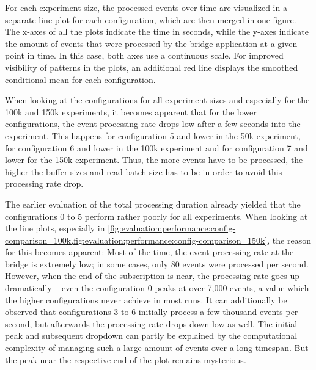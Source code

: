 For each experiment size, the processed events over time are visualized in a separate line plot for each configuration, which are then merged in one figure.
The x-axes of all the plots indicate the time in seconds, while the y-axes indicate the amount of events that were processed by the bridge application at a given point in time.
In this case, both axes use a continuous scale.
For improved visibility of patterns in the plots, an additional red line displays the smoothed conditional mean for each configuration.

When looking at the configurations for all experiment sizes and especially for the 100k and 150k experiments, it becomes apparent that for the lower configurations, the event processing rate drops low after a few seconds into the experiment.
This happens for configuration 5 and lower in the 50k experiment, for configuration 6 and lower in the 100k experiment and for configuration 7 and lower for the 150k experiment.
Thus, the more events have to be processed, the higher the buffer sizes and read batch size has to be in order to avoid this processing rate drop.

The earlier evaluation of the total processing duration already yielded that the configurations 0 to 5 perform rather poorly for all experiments.
When looking at the line plots, especially in \cref{fig:evaluation:performance:config-comparison_100k,fig:evaluation:performance:config-comparison_150k}, the reason for this becomes apparent:
Most of the time, the event processing rate at the bridge is extremely low; in some cases, only 80 events were processed per second.
However, when the end of the subscription is near, the processing rate goes up dramatically -- even the configuration 0 peaks at over 7,000 events, a value which the higher configurations never achieve in most runs.
It can additionally be observed that configurations 3 to 6 initially process a few thousand events per second, but afterwards the processing rate drops down low as well.
The initial peak and subsequent dropdown can partly be explained by the computational complexity of managing such a large amount of events over a long timespan.
But the peak near the respective end of the plot remains mysterious.

